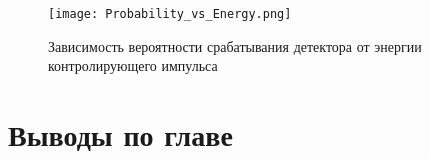  \begin{figure}[ht]
  \centering
  \texttt{[image: Probability\_vs\_Energy.png]}
  \caption{Зависимость вероятности срабатывания детектора от энергии контролирующего импульса}
  \label{fig:Probability_vs_Energy}
\end{figure}


\pagebreak
\section{Выводы по главе} \label{ch:ch2/sect12}
